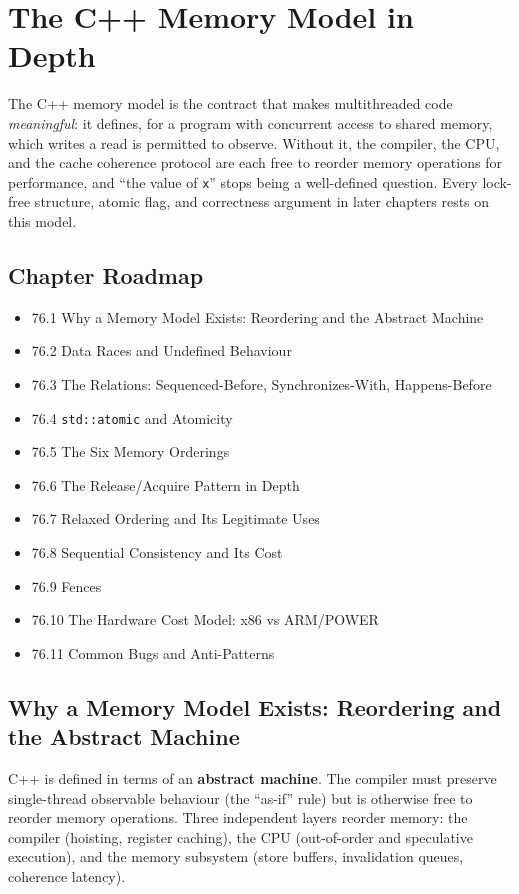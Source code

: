 \chapter{The C++ Memory Model in Depth}

The C++ memory model is the contract that makes multithreaded code \emph{meaningful}: it defines, for a program with concurrent access to shared memory, which writes a read is permitted to observe. Without it, the compiler, the CPU, and the cache coherence protocol are each free to reorder memory operations for performance, and ``the value of \texttt{x}'' stops being a well-defined question. Every lock-free structure, atomic flag, and correctness argument in later chapters rests on this model.

\section*{Chapter Roadmap}
\begin{itemize}
\item 76.1 Why a Memory Model Exists: Reordering and the Abstract Machine
\item 76.2 Data Races and Undefined Behaviour
\item 76.3 The Relations: Sequenced-Before, Synchronizes-With, Happens-Before
\item 76.4 \texttt{std::atomic} and Atomicity
\item 76.5 The Six Memory Orderings
\item 76.6 The Release/Acquire Pattern in Depth
\item 76.7 Relaxed Ordering and Its Legitimate Uses
\item 76.8 Sequential Consistency and Its Cost
\item 76.9 Fences
\item 76.10 The Hardware Cost Model: x86 vs ARM/POWER
\item 76.11 Common Bugs and Anti-Patterns
\end{itemize}

\section{Why a Memory Model Exists: Reordering and the Abstract Machine}
C++ is defined in terms of an \textbf{abstract machine}. The compiler must preserve single-thread observable behaviour (the ``as-if'' rule) but is otherwise free to reorder memory operations. Three independent layers reorder memory: the compiler (hoisting, register caching), the CPU (out-of-order and speculative execution), and the memory subsystem (store buffers, invalidation queues, coherence latency).

